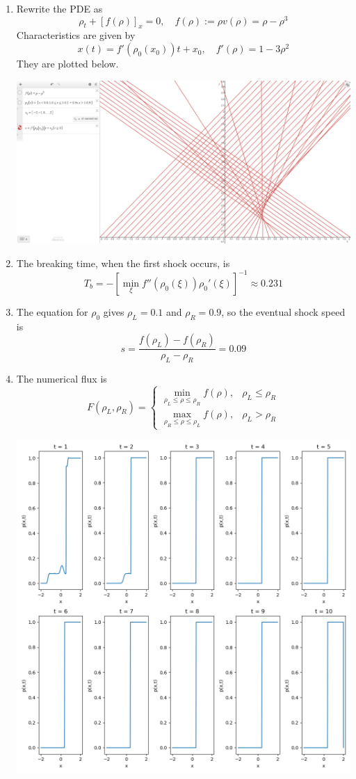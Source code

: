 \documentclass{article}
\newcommand{\sbr}[1]{\left[#1\right]}
\newcommand{\inv}{^{-1}}
\newcommand{\p}{\rho}
\begin{document}
\begin{enumerate}
\begin{enumerate}
	
	\item Rewrite the PDE as
	\[\p_t + [f(\p)]_x = 0,
	\quad f(\p) := \p v(\p) = \p - \p^3\]
	Characteristics are given by
	\[x(t) = f'(\p_0(x_0))t + x_0,
	\quad f'(\p) = 1 - 3\p^2\]
	They are plotted below.
	\begin{center}
		\includegraphics[scale=.2]{final 3a}
	\end{center}


	\item The breaking time, when the first shock occurs, is
	\[T_b = -\sbr{\min_\xi f''(\p_0(\xi))\p_0'(\xi)}\inv \approx 0.231\]
	
	\item The equation for $\p_0$ gives $\p_L=0.1$ and $\p_R=0.9$, so the eventual shock speed is
	\[s = \frac{f(\p_L)-f(\p_R)}{\p_L-\p_R} = 0.09\]
	
	\item The numerical flux is
	\[F(\p_L,\p_R) =
	\begin{cases}
		\min_{\p_L\le\p\le\p_R}f(\p), & \p_L\le\p_R \\
		\max_{\p_R\le\p\le\p_L}f(\p), & \p_L>\p_R
	\end{cases}\]

	\begin{center}
		\includegraphics[scale=.4]{final 3 sol}
	\end{center}
	

\end{enumerate}
\end{enumerate}
\end{document}
